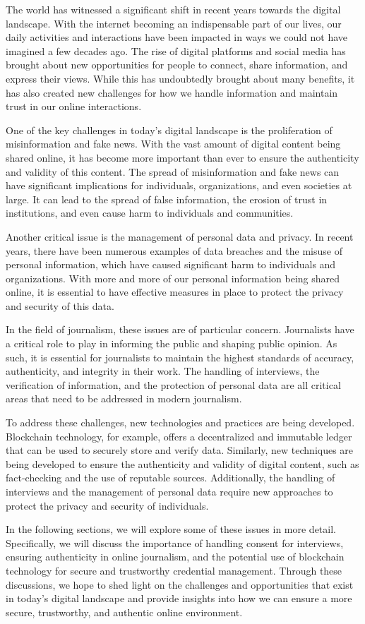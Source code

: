 \documentclass[target=mst,aauheader=]{thud}
\begin{document}
The world has witnessed a significant shift in recent years towards the digital landscape. With the internet becoming an indispensable part of our lives, our daily activities and interactions have been impacted in ways we could not have imagined a few decades ago. The rise of digital platforms and social media has brought about new opportunities for people to connect, share information, and express their views. While this has undoubtedly brought about many benefits, it has also created new challenges for how we handle information and maintain trust in our online interactions.\par
One of the key challenges in today's digital landscape is the proliferation of misinformation and fake news. With the vast amount of digital content being shared online, it has become more important than ever to ensure the authenticity and validity of this content. The spread of misinformation and fake news can have significant implications for individuals, organizations, and even societies at large. It can lead to the spread of false information, the erosion of trust in institutions, and even cause harm to individuals and communities.\par
Another critical issue is the management of personal data and privacy. In recent years, there have been numerous examples of data breaches and the misuse of personal information, which have caused significant harm to individuals and organizations. With more and more of our personal information being shared online, it is essential to have effective measures in place to protect the privacy and security of this data.\par
In the field of journalism, these issues are of particular concern. Journalists have a critical role to play in informing the public and shaping public opinion. As such, it is essential for journalists to maintain the highest standards of accuracy, authenticity, and integrity in their work. The handling of interviews, the verification of information, and the protection of personal data are all critical areas that need to be addressed in modern journalism.\par
To address these challenges, new technologies and practices are being developed. Blockchain technology, for example, offers a decentralized and immutable ledger that can be used to securely store and verify data. Similarly, new techniques are being developed to ensure the authenticity and validity of digital content, such as fact-checking and the use of reputable sources. Additionally, the handling of interviews and the management of personal data require new approaches to protect the privacy and security of individuals.\par
In the following sections, we will explore some of these issues in more detail. Specifically, we will discuss the importance of handling consent for interviews, ensuring authenticity in online journalism, and the potential use of blockchain technology for secure and trustworthy credential management. Through these discussions, we hope to shed light on the challenges and opportunities that exist in today's digital landscape and provide insights into how we can ensure a more secure, trustworthy, and authentic online environment.
\end{document}
